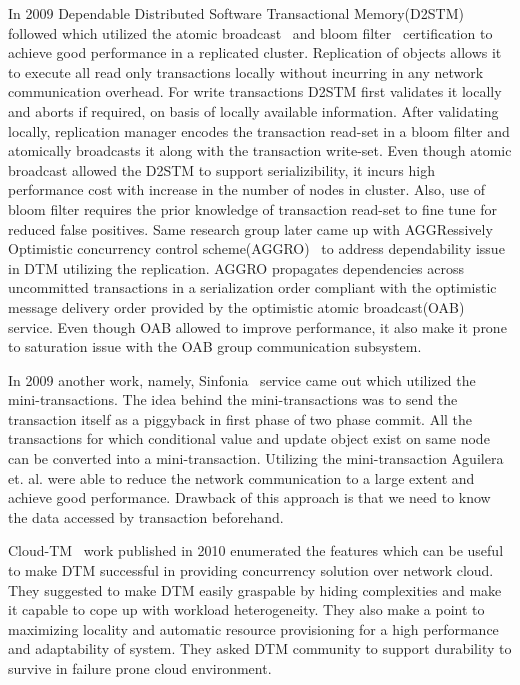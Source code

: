\documentclass[12pt,english]{report}
\begin{document}
In 2009 Dependable Distributed Software Transactional Memory(D2STM)~\cite{D2STM:5368778} followed which utilized the atomic broadcast~\cite{Defago:2004:TOB:1041680.1041682} and bloom filter~\cite{Bloom:1970:STH:362686.362692} certification to achieve good performance in a replicated cluster. Replication of objects allows it to execute all read only transactions locally without incurring in any network communication overhead. For write transactions D2STM first validates it locally and aborts if required, on basis of locally available information. After validating locally, replication manager encodes the transaction read-set in a bloom filter and atomically broadcasts it along with the transaction write-set. Even though atomic broadcast allowed the D2STM to support serializibility, it incurs high performance cost with increase in the number of nodes in cluster. Also, use of bloom filter requires the prior knowledge of transaction read-set to fine tune for reduced false positives. Same research group later came up with AGGRessively Optimistic concurrency control scheme(AGGRO)~\cite{AGGRO:5598236} to address dependability issue in DTM utilizing the replication. AGGRO propagates dependencies across uncommitted transactions in a serialization order compliant with the optimistic message delivery order provided by the optimistic atomic broadcast(OAB)~\cite{OAB:Pedone200379} service. Even though OAB allowed to improve performance, it also make it prone to saturation issue with the OAB group communication subsystem.  

In 2009 another work, namely, Sinfonia~\cite{Aguilera:2009:SNP:1629087.1629088} service came out which utilized the mini-transactions. The idea behind the mini-transactions was to send the transaction itself as a piggyback in first phase of two phase commit. All the transactions for which conditional value and update object exist on same node can be converted into a mini-transaction. Utilizing the mini-transaction Aguilera et. al. were able to reduce the network communication to a large extent and achieve good performance. Drawback of this approach is that we need to know the data accessed by transaction beforehand.

Cloud-TM~\cite{Romano:2010:CHC:1773912.1773914} work published in 2010 enumerated the features which can be useful to make DTM successful in providing concurrency solution over network cloud. They suggested to make DTM easily graspable by hiding complexities and make it capable to cope up with workload heterogeneity. They also make a point to maximizing locality and automatic resource provisioning for a high performance and adaptability of system. They asked DTM community to support durability to survive in failure prone cloud environment. 
\end{document}
